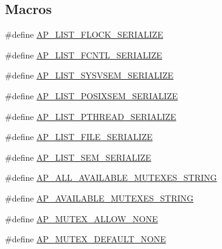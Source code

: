 \subsection*{Macros}
\begin{DoxyCompactItemize}
\item 
\#define \hyperlink{group__APACHE__CORE__MUTEX_gabc2e11da2dd371821dcdc5cc48c38013}{A\+P\+\_\+\+L\+I\+S\+T\+\_\+\+F\+L\+O\+C\+K\+\_\+\+S\+E\+R\+I\+A\+L\+I\+ZE}
\item 
\#define \hyperlink{group__APACHE__CORE__MUTEX_ga40e03cc2fd1986b03ff09044f75c7596}{A\+P\+\_\+\+L\+I\+S\+T\+\_\+\+F\+C\+N\+T\+L\+\_\+\+S\+E\+R\+I\+A\+L\+I\+ZE}
\item 
\#define \hyperlink{group__APACHE__CORE__MUTEX_ga34021f6940e7c76ecde0de0af6287ce8}{A\+P\+\_\+\+L\+I\+S\+T\+\_\+\+S\+Y\+S\+V\+S\+E\+M\+\_\+\+S\+E\+R\+I\+A\+L\+I\+ZE}
\item 
\#define \hyperlink{group__APACHE__CORE__MUTEX_ga7f9692615cc5eac9b96e5dc79c046407}{A\+P\+\_\+\+L\+I\+S\+T\+\_\+\+P\+O\+S\+I\+X\+S\+E\+M\+\_\+\+S\+E\+R\+I\+A\+L\+I\+ZE}
\item 
\#define \hyperlink{group__APACHE__CORE__MUTEX_ga08911ba30fdb65866babe19909913817}{A\+P\+\_\+\+L\+I\+S\+T\+\_\+\+P\+T\+H\+R\+E\+A\+D\+\_\+\+S\+E\+R\+I\+A\+L\+I\+ZE}
\item 
\#define \hyperlink{group__APACHE__CORE__MUTEX_ga029d3689e80ecb4eac7a6f8ea4a41e7d}{A\+P\+\_\+\+L\+I\+S\+T\+\_\+\+F\+I\+L\+E\+\_\+\+S\+E\+R\+I\+A\+L\+I\+ZE}
\item 
\#define \hyperlink{group__APACHE__CORE__MUTEX_gaf6f2198cbc4eb7ee3cc8dd073bd923a9}{A\+P\+\_\+\+L\+I\+S\+T\+\_\+\+S\+E\+M\+\_\+\+S\+E\+R\+I\+A\+L\+I\+ZE}
\item 
\#define \hyperlink{group__APACHE__CORE__MUTEX_ga9305553b8e0ad2f6b404cbfdfc9223ed}{A\+P\+\_\+\+A\+L\+L\+\_\+\+A\+V\+A\+I\+L\+A\+B\+L\+E\+\_\+\+M\+U\+T\+E\+X\+E\+S\+\_\+\+S\+T\+R\+I\+NG}
\item 
\#define \hyperlink{group__APACHE__CORE__MUTEX_ga8fbeab1da88b7f010aa52ef8255c99dd}{A\+P\+\_\+\+A\+V\+A\+I\+L\+A\+B\+L\+E\+\_\+\+M\+U\+T\+E\+X\+E\+S\+\_\+\+S\+T\+R\+I\+NG}
\item 
\#define \hyperlink{group__APACHE__CORE__MUTEX_ga8d0b1fe7b3697aec18c41ec8cf9f6d98}{A\+P\+\_\+\+M\+U\+T\+E\+X\+\_\+\+A\+L\+L\+O\+W\+\_\+\+N\+O\+NE}
\item 
\#define \hyperlink{group__APACHE__CORE__MUTEX_ga3a071a6861aac7a88042b3130017e0c0}{A\+P\+\_\+\+M\+U\+T\+E\+X\+\_\+\+D\+E\+F\+A\+U\+L\+T\+\_\+\+N\+O\+NE}
\end{DoxyCompactItemize}
